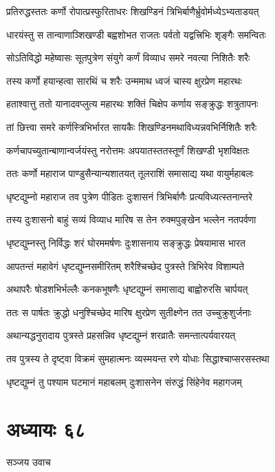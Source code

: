 \twolineshloka
{प्रतिरुद्धस्ततः कर्णो रोपात्प्रस्फुरिताधरः}
{शिखण्डिनं त्रिभिर्बाणैर्भ्रुवोर्मध्येऽभ्यताडयत्}


\twolineshloka
{धारयंस्तु स तान्वाणाञ्शिखण्डी बह्वशोभत}
{राजतः पर्वतो यद्वत्त्रिभिः शृङ्गैः समन्वितः}


\twolineshloka
{सोऽतिविद्धो महेष्वासः सूतपुत्रेण संयुगे}
{कर्णं विव्याध समरे नवत्या निशितैः शरैः}


\twolineshloka
{तस्य कर्णो हयान्हत्वा सारथिं च शरैः}
{उन्ममाथ ध्वजं चास्य क्षुरप्रेण महारथः}


\twolineshloka
{हताश्वात्तु ततो यानादवप्लुत्य महारथः}
{शक्तिं चिक्षेप कर्णाय सङ्क्रुद्धः शत्रुतापनः}


\twolineshloka
{तां छित्त्वा समरे कर्णस्त्रिभिर्भारत सायकैः}
{शिखण्डिनमथाविध्यन्नवभिर्निशितैः शरैः}


\twolineshloka
{कर्णचापच्युतान्बाणान्वर्जयंस्तु नरोत्तमः}
{अपयातस्ततस्तूर्णं शिखण्डी भृशविक्षतः}


\twolineshloka
{ततः कर्णो महाराज पाण्डुसैन्यान्यशातयत्}
{तूलराशिं समासाद्य यथा वायुर्महाबलः}


\twolineshloka
{धृष्टद्युम्नो महाराज तव पुत्रेण पीडितः}
{दुःशासनं त्रिभिर्बाणैः प्रत्यविध्यत्स्तनान्तरे}


\twolineshloka
{तस्य दुःशासनो बाहुं सव्यं विव्याध मारिष}
{स तेन रुक्मपुङ्खेन भल्लेन नतपर्वणा}


\twolineshloka
{धृष्टद्युम्नस्तु निर्विद्धः शरं घोरममर्षणः}
{दुःशासनाय सङ्क्रुद्धः प्रेषयामास भारत}


\twolineshloka
{आपतन्तं महावेगं धृष्टद्युम्नसमीरितम्}
{शरैश्चिच्छेद पुत्रस्ते त्रिभिरेव विशाम्पते}


\twolineshloka
{अथापरैः षोडशभिर्भल्लैः कनकभूषणैः}
{धृष्टद्युम्नं समासाद्य बाह्वोरुरसि चार्पयत्}


\twolineshloka
{ततः स पार्षतः क्रुद्धो धनुश्चिच्छेद मारिष}
{क्षुरप्रेण सुतीक्ष्णेन तत उच्चुक्रुशुर्जनाः}


\twolineshloka
{अथान्यद्धनुरादाय पुत्रस्ते प्रहसन्निव}
{धृष्टद्युम्नं शरव्रातैः समन्तात्पर्यवारयत्}


\twolineshloka
{तव पुत्रस्य ते दृष्ट्वा विक्रमं सुमहात्मनः}
{व्यस्मयन्त रणे योधाः सिद्धाश्चाप्सरसस्तथा}


\twolineshloka
{धृष्टद्युम्नं तु पश्याम घटमानं महाबलम्}
{दुःशासनेन संरुद्धं सिंहेनेव महागजम्}


\chapter{अध्यायः ६८}
\twolineshloka
{सञ्जय उवाच}
{}


